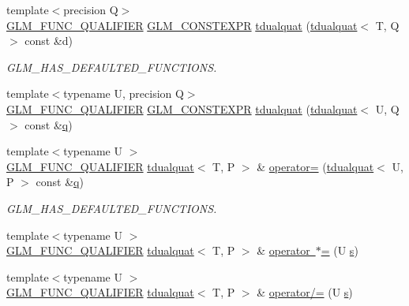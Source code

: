 \begin{DoxyCompactItemize}
\item 
{\footnotesize template$<$precision Q$>$ }\\\mbox{\hyperlink{setup_8hpp_a33fdea6f91c5f834105f7415e2a64407}{G\+L\+M\+\_\+\+F\+U\+N\+C\+\_\+\+Q\+U\+A\+L\+I\+F\+I\+ER}} \mbox{\hyperlink{setup_8hpp_a08b807947b47031d3a511f03f89645ad}{G\+L\+M\+\_\+\+C\+O\+N\+S\+T\+E\+X\+PR}} \mbox{\hyperlink{structglm_1_1tdualquat_a9cf5d2c303cd089e7a87d72172ea827e}{tdualquat}} (\mbox{\hyperlink{structglm_1_1tdualquat}{tdualquat}}$<$ T, Q $>$ const \&d)
\begin{DoxyCompactList}\small\item\em G\+L\+M\+\_\+\+H\+A\+S\+\_\+\+D\+E\+F\+A\+U\+L\+T\+E\+D\+\_\+\+F\+U\+N\+C\+T\+I\+O\+NS. \end{DoxyCompactList}\item 
{\footnotesize template$<$typename U, precision Q$>$ }\\\mbox{\hyperlink{setup_8hpp_a33fdea6f91c5f834105f7415e2a64407}{G\+L\+M\+\_\+\+F\+U\+N\+C\+\_\+\+Q\+U\+A\+L\+I\+F\+I\+ER}} \mbox{\hyperlink{setup_8hpp_a08b807947b47031d3a511f03f89645ad}{G\+L\+M\+\_\+\+C\+O\+N\+S\+T\+E\+X\+PR}} \mbox{\hyperlink{structglm_1_1tdualquat_a7a1546841d7a1b2bc12a5bfa65c625e8}{tdualquat}} (\mbox{\hyperlink{structglm_1_1tdualquat}{tdualquat}}$<$ U, Q $>$ const \&\mbox{\hyperlink{glad_8h_a514729309336df22bcc8eda979d6ced4}{q}})
\item 
{\footnotesize template$<$typename U $>$ }\\\mbox{\hyperlink{setup_8hpp_a33fdea6f91c5f834105f7415e2a64407}{G\+L\+M\+\_\+\+F\+U\+N\+C\+\_\+\+Q\+U\+A\+L\+I\+F\+I\+ER}} \mbox{\hyperlink{structglm_1_1tdualquat}{tdualquat}}$<$ T, P $>$ \& \mbox{\hyperlink{structglm_1_1tdualquat_a4c6247ec39b3e82e5224988ec4312c77}{operator=}} (\mbox{\hyperlink{structglm_1_1tdualquat}{tdualquat}}$<$ U, P $>$ const \&\mbox{\hyperlink{glad_8h_a514729309336df22bcc8eda979d6ced4}{q}})
\begin{DoxyCompactList}\small\item\em G\+L\+M\+\_\+\+H\+A\+S\+\_\+\+D\+E\+F\+A\+U\+L\+T\+E\+D\+\_\+\+F\+U\+N\+C\+T\+I\+O\+NS. \end{DoxyCompactList}\item 
{\footnotesize template$<$typename U $>$ }\\\mbox{\hyperlink{setup_8hpp_a33fdea6f91c5f834105f7415e2a64407}{G\+L\+M\+\_\+\+F\+U\+N\+C\+\_\+\+Q\+U\+A\+L\+I\+F\+I\+ER}} \mbox{\hyperlink{structglm_1_1tdualquat}{tdualquat}}$<$ T, P $>$ \& \mbox{\hyperlink{structglm_1_1tdualquat_abdafad626b2fe6786416b7fa9904b467}{operator $\ast$=}} (U \mbox{\hyperlink{glad_8h_af1b1d5edfea6a34daee7389b1b5810ad}{s}})
\item 
{\footnotesize template$<$typename U $>$ }\\\mbox{\hyperlink{setup_8hpp_a33fdea6f91c5f834105f7415e2a64407}{G\+L\+M\+\_\+\+F\+U\+N\+C\+\_\+\+Q\+U\+A\+L\+I\+F\+I\+ER}} \mbox{\hyperlink{structglm_1_1tdualquat}{tdualquat}}$<$ T, P $>$ \& \mbox{\hyperlink{structglm_1_1tdualquat_a1843b865427cf6d2e474959376a1c412}{operator/=}} (U \mbox{\hyperlink{glad_8h_af1b1d5edfea6a34daee7389b1b5810ad}{s}})
\end{DoxyCompactItemize}
